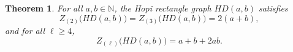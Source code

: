 \documentclass[11pt]{article}
\theoremstyle{plain} \newtheorem{question}{Question}
\newtheorem{thm}{Theorem}
\theoremstyle{definition}
\begin{document}
\begin{thm}\label{cor:recover-hopi-from-versionB}
For all $a,b\in\mathbb{N}$, the Hopi rectangle graph $HD(a,b)$ satisfies
\[
Z_{(2)}\!\bigl(HD(a,b)\bigr)=Z_{(3)}\!\bigl(HD(a,b)\bigr)=2(a+b),
\]
and for all $\ell\ge 4$,
\[
Z_{(\ell)}\!\bigl(HD(a,b)\bigr)=a+b+2a b.
\]
\end{thm}



\end{document}
